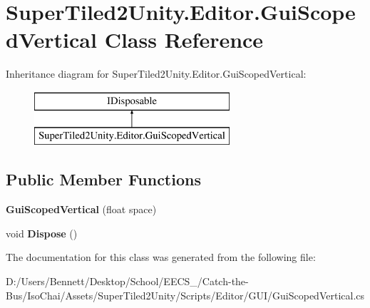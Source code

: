 \hypertarget{class_super_tiled2_unity_1_1_editor_1_1_gui_scoped_vertical}{}\section{Super\+Tiled2\+Unity.\+Editor.\+Gui\+Scoped\+Vertical Class Reference}
\label{class_super_tiled2_unity_1_1_editor_1_1_gui_scoped_vertical}
Inheritance diagram for Super\+Tiled2\+Unity.\+Editor.\+Gui\+Scoped\+Vertical\+:\begin{figure}[H]
\begin{center}
\leavevmode
\includegraphics[height=2.000000cm]{class_super_tiled2_unity_1_1_editor_1_1_gui_scoped_vertical}
\end{center}
\end{figure}
\subsection*{Public Member Functions}
\begin{DoxyCompactItemize}
\item 
\mbox{\label{class_super_tiled2_unity_1_1_editor_1_1_gui_scoped_vertical_a68a971113a59e72c0b7f4ac515a491da}} 
{\bfseries Gui\+Scoped\+Vertical} (float space)
\item 
\mbox{\label{class_super_tiled2_unity_1_1_editor_1_1_gui_scoped_vertical_a26b0c819004a1838a007332a7517b594}} 
void {\bfseries Dispose} ()
\end{DoxyCompactItemize}


The documentation for this class was generated from the following file\+:\begin{DoxyCompactItemize}
\item 
D\+:/\+Users/\+Bennett/\+Desktop/\+School/\+E\+E\+C\+S\+\_/\+Catch-\/the-\/\+Bus/\+Iso\+Chai/\+Assets/\+Super\+Tiled2\+Unity/\+Scripts/\+Editor/\+G\+U\+I/Gui\+Scoped\+Vertical.\+cs\end{DoxyCompactItemize}
